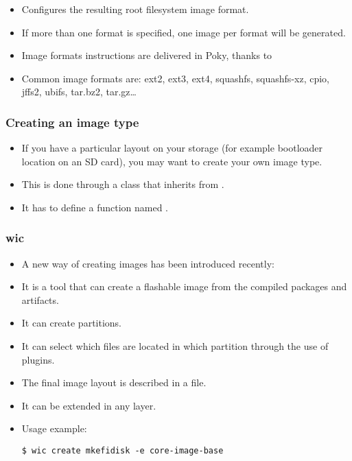 \begin{frame}
  \frametitle{}
  \begin{itemize}
    \item Configures the resulting root filesystem image format.
    \item If more than one format is specified, one image per format
      will be generated.
    \item Image formats instructions are delivered in Poky, thanks to
    \item Common image formats are: ext2, ext3, ext4, squashfs,
      squashfs-xz, cpio, jffs2, ubifs, tar.bz2, tar.gz\dots
  \end{itemize}
\end{frame}

\begin{frame}
  \frametitle{Creating an image type}
  \begin{itemize}
    \item If you have a particular layout on your storage (for example
      bootloader location on an SD card), you may want to create your
      own image type.
    \item This is done through a class that inherits from
      .
    \item It has to define a function named .
  \end{itemize}
\end{frame}

\begin{frame}[fragile]
  \frametitle{wic}
  \begin{itemize}
    \item A new way of creating images has been introduced recently:
    \item It is a tool that can create a flashable image from the
      compiled packages and artifacts.
    \item It can create partitions.
    \item It can select which files are located in
      which partition through the use of plugins.
    \item The final image layout is described in a  file.
    \item It can be extended in any layer.
    \item Usage example:
      \begin{block}{}
        \begin{verbatim}
$ wic create mkefidisk -e core-image-base
        \end{verbatim}
      \end{block}
  \end{itemize}
\end{frame}

